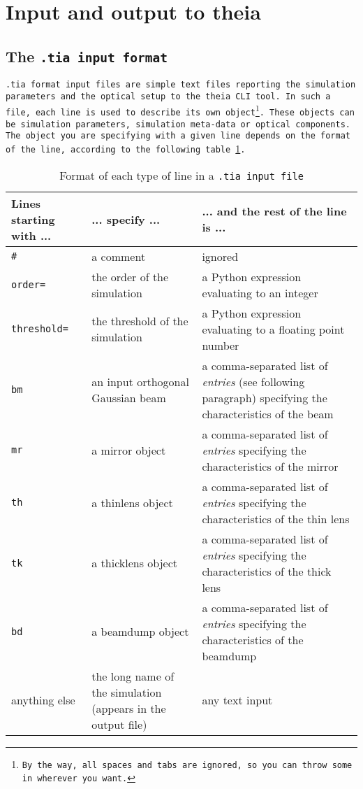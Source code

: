 \documentclass{article}
\begin{document}
\section{Input and output to theia}
\subsection{The \tt{.tia} input format}
\tt{.tia} format input files are simple text files reporting the simulation parameters and the optical setup to the \tt{theia} CLI tool. In such a file, each line is used to describe its own object\footnote{By the way, all spaces and tabs are ignored, so you can throw some in wherever you want.}. These objects can be simulation parameters, simulation meta-data or optical components. The object you are specifying with a given line depends on the format of the line, according to the following table \ref{inputformat}.

\begin{table}[h]
\begin{center}
\begin{tabular}{|p{3cm}|p{4cm}|p{8cm}|}
\hline
\textbf{Lines starting with ...} & \textbf{... specify ...} & \textbf{... and the rest of the line is ...} \\ \hline \hline

\tt{\#} & a comment & ignored \\ \hline

\tt{order=} & the order of the simulation & a Python expression evaluating to an integer \\ \hline
\tt{threshold=} & the threshold of the simulation & a Python expression evaluating to a floating point number  \\ \hline

\tt{bm} & an input orthogonal Gaussian beam & a comma-separated list of \textit{entries}  (see following paragraph) specifying the characteristics of the beam \\ \hline
\tt{mr} & a mirror object & a comma-separated list of \textit{entries} specifying the characteristics of the mirror \\ \hline
\tt{th} & a thinlens object & a comma-separated list of \textit{entries} specifying the characteristics of the thin lens \\ \hline
\tt{tk} & a thicklens object & a comma-separated list of \textit{entries} specifying the characteristics of the thick lens \\ \hline
\tt{bd} & a beamdump object & a comma-separated list of \textit{entries} specifying the characteristics of the beamdump \\ \hline

anything else & the long name of the simulation (appears in the output file) & any text input \\ \hline



\end{tabular}
\end{center}
\caption{Format of each type of line in a \tt{.tia} input file}
\label{inputformat}
\end{table}
\end{document}
